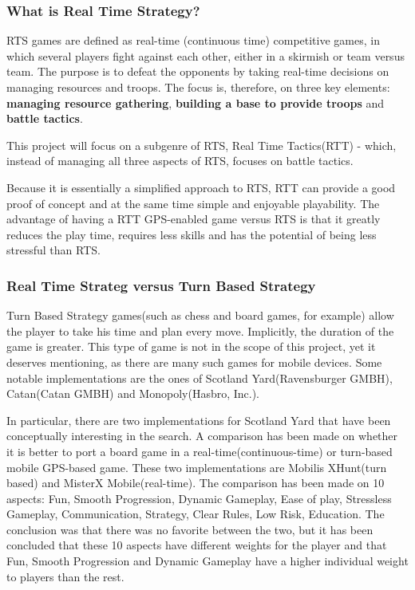 \documentclass{article}
\begin{document}
\subsubsection{What is Real Time Strategy?}

RTS games are defined as real-time (continuous time) competitive games, in which
several players fight against each other, either in a skirmish or team versus
team. The purpose is to defeat the opponents by taking real-time decisions on
managing resources and troops. The focus is, therefore, on three key elements:
\textbf{managing resource gathering}, \textbf{building a base to provide troops}
and \textbf{battle tactics}.\cite{rts}\newline

This project will focus on a subgenre of RTS, Real Time Tactics(RTT) - which,
instead of managing all three aspects of RTS, focuses on battle tactics.\newline

Because it is essentially a simplified approach to RTS\cite{rttvsrts}, RTT can
provide a good proof of concept and at the same time simple and enjoyable
playability. The advantage of having a RTT GPS-enabled game versus RTS is that
it greatly reduces the play time, requires less skills and has the potential of
being less stressful than RTS.\newline

\subsubsection{Real Time Strateg versus Turn Based Strategy}

Turn Based Strategy games\cite{rtsvstbs}(such as chess and board games, for
example) allow the player to take his time and plan every move. Implicitly, the
duration of the game is greater. This type of game is not in the scope of this
project, yet it deserves mentioning, as there are many such games for mobile
devices. Some notable implementations are the ones of Scotland Yard(Ravensburger
GMBH), Catan(Catan GMBH) and Monopoly(Hasbro, Inc.).\newline

In particular, there are two implementations for Scotland Yard that have been
conceptually interesting in the search. A comparison has been
made\cite{rttvsrts2} on whether it is better to port a board game in a
real-time(continuous-time) or turn-based mobile GPS-based game. These two
implementations are Mobilis XHunt(turn based) and MisterX Mobile(real-time). The
comparison has been made on 10 aspects: Fun, Smooth Progression, Dynamic
Gameplay, Ease of play, Stressless Gameplay, Communication, Strategy, Clear
Rules, Low Risk, Education. The conclusion was that there was no favorite
between the two, but it has been concluded that these 10 aspects have different
weights for the player and that Fun, Smooth Progression and Dynamic Gameplay
have a higher individual weight to players than the rest.\cite[p.5]{rttvsrts2}
\newline
\end{document}
